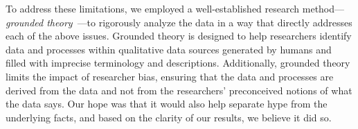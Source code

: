 To address these limitations, we employed a well-established research 
method---\emph{grounded 
theory}~\cite{corbin1990grounded,wolfswinkel2013using}---to rigorously analyze 
the data in a way that directly addresses each of the above issues.
Grounded theory is designed to help researchers identify data and processes 
within qualitative data sources generated by humans and filled with imprecise 
terminology and descriptions.
Additionally, grounded theory limits the impact of researcher bias, ensuring that the data and processes are derived from the data and not from the researchers' preconceived notions of what the data says.
Our hope was that it would also help separate hype from the underlying facts, 
and based on the clarity of our results, we believe it did so.







